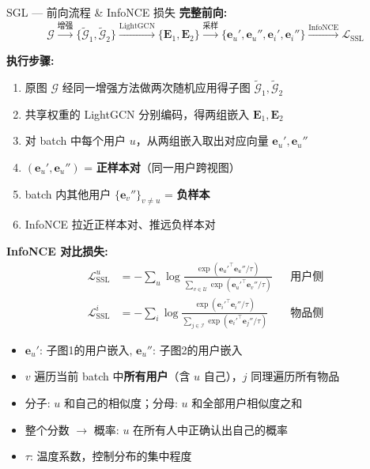 \documentclass[9pt, aspectratio=169]{ctexbeamer}
\begin{document}
\begin{frame}{SGL --- 前向流程 \& InfoNCE 损失}
  \textbf{完整前向:}
  \begin{equation*}
    \mathcal{G} \xrightarrow{\text{增强}} \{\tilde{\mathcal{G}}_1,\tilde{\mathcal{G}}_2\}
    \xrightarrow{\text{LightGCN}} \{\mathbf{E}_1,\mathbf{E}_2\}
    \xrightarrow{\text{采样}} \{\mathbf{e}_u',\mathbf{e}_u'',\mathbf{e}_i',\mathbf{e}_i''\}
    \xrightarrow{\text{InfoNCE}} \mathcal{L}_{\text{SSL}}
  \end{equation*}

  \textbf{执行步骤:}
  \begin{enumerate}\footnotesize
    \item 原图 $\mathcal{G}$ 经同一增强方法做两次随机应用得子图 $\tilde{\mathcal{G}}_1,\tilde{\mathcal{G}}_2$
    \item 共享权重的 LightGCN 分别编码，得两组嵌入 $\mathbf{E}_1,\mathbf{E}_2$
    \item 对 batch 中每个用户 $u$，从两组嵌入取出对应向量 $\mathbf{e}_u',\mathbf{e}_u''$
    \item $(\mathbf{e}_u',\mathbf{e}_u'')$ = \textbf{正样本对}（同一用户跨视图）
    \item batch 内其他用户 $\{\mathbf{e}_v''\}_{v\neq u}$ = \textbf{负样本}
    \item InfoNCE 拉近正样本对、推远负样本对
  \end{enumerate}

  \textbf{InfoNCE 对比损失:}
  \begin{align*}
    \mathcal{L}_{\text{SSL}}^u &= -\sum_{u} \log\frac{\exp(\mathbf{e}_u'^{\top}\mathbf{e}_u''/\tau)}
                                       {\sum_{v\in\mathcal{U}}\exp(\mathbf{e}_u'^{\top}\mathbf{e}_v''/\tau)}
    &&\text{用户侧} \\
    \mathcal{L}_{\text{SSL}}^i &= -\sum_{i} \log\frac{\exp(\mathbf{e}_i'^{\top}\mathbf{e}_i''/\tau)}
                                       {\sum_{j\in\mathcal{I}}\exp(\mathbf{e}_i'^{\top}\mathbf{e}_j''/\tau)}
    &&\text{物品侧}
  \end{align*}
  \begin{itemize}\footnotesize
    \item $\mathbf{e}_u'$: 子图1的用户嵌入, $\mathbf{e}_u''$: 子图2的用户嵌入
    \item $v$ 遍历当前 batch 中\textbf{所有用户}（含 $u$ 自己），$j$ 同理遍历所有物品
    \item 分子: $u$ 和自己的相似度；分母: $u$ 和全部用户相似度之和
    \item 整个分数 $\to$ 概率: $u$ 在所有人中正确认出自己的概率
    \item $\tau$: 温度系数，控制分布的集中程度
  \end{itemize}
\end{frame}
\end{document}
